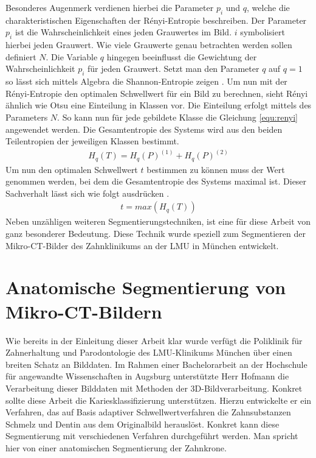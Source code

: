 Besonderes Augenmerk verdienen hierbei die Parameter $p_{i}$ und $q$, welche die
charakteristischen Eigenschaften der Rényi-Entropie beschreiben. Der Parameter $p
_{i}$ ist die Wahrscheinlichkeit eines jeden Grauwertes im Bild. $i$
symbolisiert hierbei jeden Grauwert. Wie viele Grauwerte genau betrachten werden
sollen definiert $N$. Die Variable $q$ hingegen beeinflusst die Gewichtung der
Wahrscheinlichkeit $p_{i}$ für jeden Grauwert. Setzt man den Parameter $q$ auf $q
= 1$ so lässt sich mittels Algebra die Shannon-Entropie zeigen \citep[vgl.][K.~2]{bromiley2004}.
Um nun mit der Rényi-Entropie den optimalen Schwellwert für ein Bild zu berechnen,
sieht Rényi ähnlich wie Otsu eine Einteilung in Klassen vor. Die Einteilung erfolgt
mittels des Parameters $N$. So kann nun für jede gebildete Klasse die Gleichung
\ref{equ:renyi} angewendet werden. Die Gesamtentropie des Systems wird aus den beiden
Teilentropien der jeweiligen Klassen bestimmt\citep[vgl.][K.~2]{bromiley2004}.
\begin{align}
	H_{q}(T) = H_{q}(P)^{(1)}+ H_{q}(P)^{(2)}
\end{align}
Um nun den optimalen Schwellwert $t$ bestimmen zu können muss der Wert genommen
werden, bei dem die Gesamtentropie des Systems maximal ist. Dieser Sachverhalt
lässt sich wie folgt ausdrücken \citep[vgl.][K.~2]{bromiley2004}.
\begin{align}
	t = max(H_{q}(T))
\end{align}
Neben unzähligen weiteren Segmentierungstechniken, ist eine für diese Arbeit von
ganz besonderer Bedeutung. Diese Technik wurde speziell zum Segmentieren der
Mikro-\ac{CT}-Bilder des Zahnklinikums an der \ac{LMU} in München entwickelt.

\pagebreak

\section{Anatomische Segmentierung von Mikro-CT-Bildern}
\label{sec:verwwandte_arbeit} Wie bereits in der Einleitung dieser Arbeit klar wurde
verfügt die Poliklinik für Zahnerhaltung und Parodontologie des \ac{LMU}-Klinikums
München über einen breiten Schatz an Bilddaten. Im Rahmen einer Bachelorarbeit an
der Hochschule für angewandte Wissenschaften in Augsburg unterstützte Herr Hofmann
die Verarbeitung dieser Bilddaten mit Methoden der 3D-Bildverarbeitung. Konkret
sollte diese Arbeit die Kariesklassifizierung unterstützen. Hierzu entwickelte er
ein Verfahren, das auf Basis adaptiver Schwellwertverfahren die Zahnsubstanzen
Schmelz und Dentin aus dem Originalbild herauslöst. Konkret kann diese Segmentierung
mit verschiedenen Verfahren durchgeführt werden. Man spricht hier von einer
anatomischen Segmentierung der Zahnkrone.

